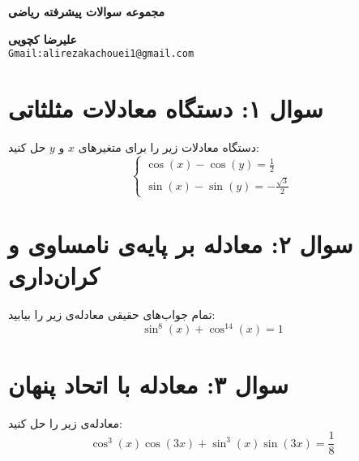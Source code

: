 \documentclass[12pt]{article}
\begin{document}
	\begin{center}
		\Large\textbf{مجموعه سوالات پیشرفته ریاضی}
		\vspace{0.5cm}
	\end{center}
\begin{center}
	\Large\textbf{علیرضا کچویی} \\
	\vspace{0.5cm} %
	\normalsize\texttt{Gmail:alirezakachouei1@gmail.com} %
	\vspace{0.5cm}
\end{center}
	\hrulefill
	\vspace{1cm}
	\section*{سوال ۱: دستگاه معادلات مثلثاتی}
	دستگاه معادلات زیر را برای متغیرهای \(x\) و \(y\) حل کنید:
	\begin{displaymath}
		\begin{cases}
			\cos(x) - \cos(y) = \frac{1}{2} \\
			\sin(x) - \sin(y) = -\frac{\sqrt{3}}{2}
		\end{cases}
	\end{displaymath}
	
	
	\vspace{1cm}
	\hrulefill
	
	
	\vspace{1cm}
	\section*{سوال ۲: معادله بر پایه‌ی نامساوی و کران‌داری}
	تمام جواب‌های حقیقی معادله‌ی زیر را بیابید:
	\begin{displaymath}
		\sin^8(x) + \cos^{14}(x) = 1
	\end{displaymath}
	
	
	\vspace{1cm}
	\hrulefill
	\vspace{1cm}
	\section*{سوال ۳: معادله با اتحاد پنهان}
	معادله‌ی زیر را حل کنید:
	\begin{displaymath}
		\cos^3(x)\cos(3x) + \sin^3(x)\sin(3x) = \frac{1}{8}
	\end{displaymath}
	
\end{document}
